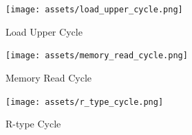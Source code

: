 \begin{figure}[ht!]
    \begin{center}
    \texttt{[image: assets/load\_upper\_cycle.png]}
    \caption{Load Upper Cycle}
    \label{fig:load_upper_cycle}
    \end{center}
\end{figure}

\begin{figure}[ht!]
    \begin{center}
    \texttt{[image: assets/memory\_read\_cycle.png]}
    \caption{Memory Read Cycle}
    \label{fig:memory_read_cycle}
    \end{center}
\end{figure}

\begin{figure}[ht!]
    \begin{center}
    \texttt{[image: assets/r\_type\_cycle.png]}
    \caption{R-type Cycle}
    \label{fig:r_type_cycle}
    \end{center}
\end{figure}
